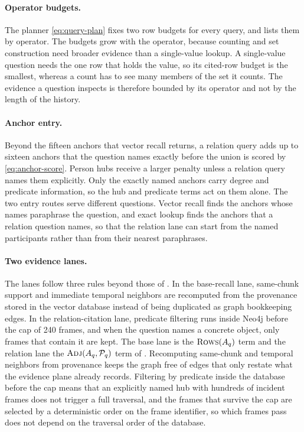 \paragraph{Operator budgets.}
The planner \eqref{eq:query-plan} fixes two row budgets for every query, and
 lists them by operator.
The budgets grow with the operator, because counting and set construction need
broader evidence than a single-value lookup. A single-value question needs the
one row that holds the value, so its cited-row budget is the smallest, whereas a count has to see many members of the set it counts. The evidence a
question inspects is therefore bounded by its operator and not by the length of
the history.

\paragraph{Anchor entry.}
Beyond the fifteen anchors that vector recall returns, a relation query adds up
to sixteen anchors that the question names exactly before the union is scored
by \eqref{eq:anchor-score}. Person hubs receive a larger penalty unless a
relation query names them explicitly. Only the exactly named anchors carry degree
and predicate information, so the hub and predicate terms act on them alone.
The two entry routes serve different questions. Vector recall finds the anchors
whose names paraphrase the question, and exact lookup finds the anchors that a
relation question names, so that the relation lane can start from the named
participants rather than from their nearest paraphrases.

\paragraph{Two evidence lanes.}
The lanes follow three rules beyond those of . In the
base-recall lane, same-chunk support and immediate temporal neighbors are
recomputed from the provenance stored in the vector database instead of being duplicated as graph
bookkeeping edges. In the relation-citation lane, predicate filtering runs
inside Neo4j before the cap of 240 frames, and when the question names a
concrete object, only frames that contain it are kept. The base lane is the \(\textsc{Rows}(A_q)\) term and the relation lane the
\(\textsc{Adj}(A_q,\mathcal P_q)\) term of . Recomputing
same-chunk and temporal neighbors from provenance keeps the graph free of edges
that only restate what the evidence plane already records. Filtering by
predicate inside the database before the cap means that an explicitly named hub
with hundreds of incident frames does not trigger a full traversal, and the
frames that survive the cap are selected by a deterministic order on the frame
identifier, so which frames pass does not depend on the traversal order of the
database.

